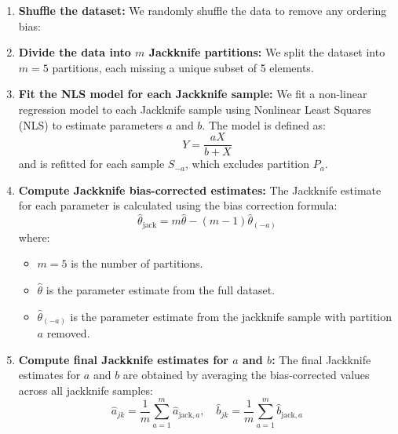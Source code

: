 \documentclass[]{article}
\begin{document}
\begin{enumerate}
	\item \textbf{Shuffle the dataset:} We randomly shuffle the data to remove any ordering bias:

	\item \textbf{Divide the data into $m$ Jackknife partitions:} We split the dataset into $m = 5$ partitions, each missing a unique subset of 5 elements.
	
	\item \textbf{Fit the NLS model for each Jackknife sample:} We fit a non-linear regression model to each Jackknife sample using Nonlinear Least Squares (NLS) to estimate parameters $a$ and $b$. The model is defined as:
	\begin{equation}
		Y = \frac{aX}{b+X}
	\end{equation}
	and is refitted for each sample $S_{-a}$, which excludes partition $P_a$.
	
	\item \textbf{Compute Jackknife bias-corrected estimates:} The Jackknife estimate for each parameter is calculated using the bias correction formula:
	\begin{equation}
		\hat{\theta}_{\text{jack}} = m \hat{\theta} - (m-1) \hat{\theta}_{(-a)}
	\end{equation}
	where:
	\begin{itemize}
		\item $m = 5$ is the number of partitions.
		\item $\hat{\theta}$ is the parameter estimate from the full dataset.
		\item $\hat{\theta}_{(-a)}$ is the parameter estimate from the jackknife sample with partition $a$ removed.
	\end{itemize}
	
	\item \textbf{Compute final Jackknife estimates for $a$ and $b$:} The final Jackknife estimates for $a$ and $b$ are obtained by averaging the bias-corrected values across all jackknife samples:
	\begin{equation}
		\hat{a}_{jk} = \frac{1}{m} \sum_{a=1}^{m} \hat{a}_{\text{jack}, a}, \quad
		\hat{b}_{jk} = \frac{1}{m} \sum_{a=1}^{m} \hat{b}_{\text{jack}, a}
	\end{equation}
\end{enumerate}
\end{document}
